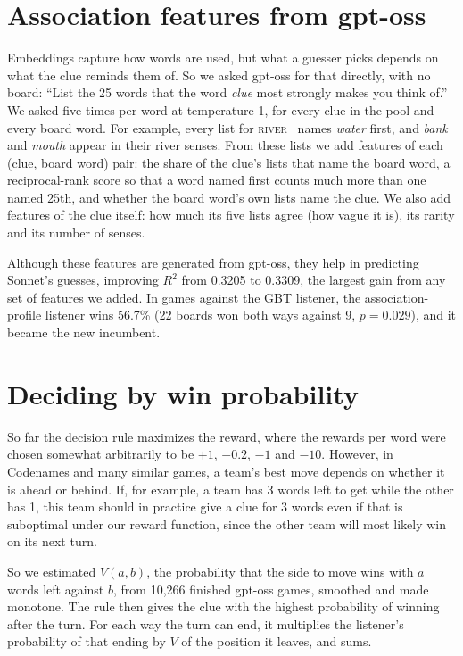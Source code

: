\documentclass[11pt]{article}
\newcommand{\clue}[2]{\textsc{#1}~#2}
\begin{document}
\section{Association features from gpt-oss}

Embeddings capture how words are used, but what a guesser picks depends on what
the clue reminds them of. So we asked gpt-oss for that directly, with no board:
``List the 25 words that the word \emph{clue} most strongly makes you think of.''
We asked five times per word at temperature 1, for every clue in the pool and
every board word. For example, every list for \clue{river}{} names \emph{water}
first, and \emph{bank} and \emph{mouth} appear in their river senses. From these
lists we add features of each (clue, board word) pair: the share of the clue's
lists that name the board word, a reciprocal-rank score so that a word named
first counts much more than one named 25th, and whether the board word's own
lists name the clue. We also add features of the clue itself: how much its five
lists agree (how vague it is), its rarity and its number of senses.

Although these features are generated from gpt-oss, they help in predicting
Sonnet's guesses, improving $R^2$ from 0.3205 to 0.3309, the largest gain from
any set of features we added. In games against the GBT listener, the
association-profile listener wins 56.7\% (22 boards won both ways against 9,
$p = 0.029$), and it became the new incumbent.

\section{Deciding by win probability}

So far the decision rule maximizes the reward, where the rewards per word were
chosen somewhat arbitrarily to be $+1$, $-0.2$, $-1$ and $-10$. However, in
Codenames and many similar games, a team's best move depends on whether it is
ahead or behind. If, for example, a team has 3 words left to get while the other
has 1, this team should in practice give a clue for 3 words even if that is
suboptimal under our reward function, since the other team will most likely
win on its next turn.

So we estimated $V(a, b)$, the probability that the side to move wins with $a$
words left against $b$, from 10,266 finished gpt-oss games, smoothed and made
monotone. The rule then gives the clue with the highest probability of winning
after the turn. For each way the turn can end, it multiplies the listener's
probability of that ending by $V$ of the position it leaves, and sums.
\end{document}
